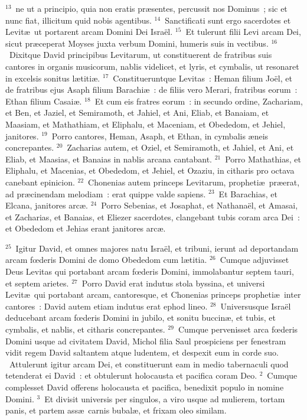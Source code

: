 ${}^{13}$~ne ut a principio, quia non eratis pr\ae sentes, percussit nos Dominus~; sic et nunc fiat, illicitum quid nobis agentibus.
${}^{14}$~Sanctificati sunt ergo sacerdotes et Levit\ae\ ut portarent arcam Domini Dei Isra\"el.
${}^{15}$~Et tulerunt filii Levi arcam Dei, sicut pr\ae ceperat Moyses juxta verbum Domini, humeris suis in vectibus.
${}^{16}$~Dixitque David principibus Levitarum, ut constituerent de fratribus suis cantores in organis musicorum, nablis videlicet, et lyris, et cymbalis, ut resonaret in excelsis sonitus l\ae titi\ae .
${}^{17}$~Constitueruntque Levitas~: Heman filium Jo\"el, et de fratribus ejus Asaph filium Barachi\ae~: de filiis vero Merari, fratribus eorum~: Ethan filium Casai\ae .
${}^{18}$~Et cum eis fratres eorum~: in secundo ordine, Zachariam, et Ben, et Jaziel, et Semiramoth, et Jahiel, et Ani, Eliab, et Banaiam, et Maasiam, et Mathathiam, et Eliphalu, et Maceniam, et Obededom, et Jehiel, janitores.
${}^{19}$~Porro cantores, Heman, Asaph, et Ethan, in cymbalis \ae neis concrepantes.
${}^{20}$~Zacharias autem, et Oziel, et Semiramoth, et Jahiel, et Ani, et Eliab, et Maasias, et Banaias in nablis arcana cantabant.
${}^{21}$~Porro Mathathias, et Eliphalu, et Macenias, et Obededom, et Jehiel, et Ozaziu, in citharis pro octava canebant epinicion.
${}^{22}$~Chonenias autem princeps Levitarum, propheti\ae\ pr\ae erat, ad pr\ae cinendam melodiam~: erat quippe valde sapiens.
${}^{23}$~Et Barachias, et Elcana, janitores arc\ae .
${}^{24}$~Porro Sebenias, et Josaphat, et Nathana\"el, et Amasai, et Zacharias, et Banaias, et Eliezer sacerdotes, clangebant tubis coram arca Dei~: et Obededom et Jehias erant janitores arc\ae .


${}^{25}$~Igitur David, et omnes majores natu Isra\"el, et tribuni, ierunt ad deportandam arcam fœderis Domini de domo Obededom cum l\ae titia.
${}^{26}$~Cumque adjuvisset Deus Levitas qui portabant arcam fœderis Domini, immolabantur septem tauri, et septem arietes.
${}^{27}$~Porro David erat indutus stola byssina, et universi Levit\ae\ qui portabant arcam, cantoresque, et Chonenias princeps propheti\ae\ inter cantores~: David autem etiam indutus erat ephod lineo.
${}^{28}$~Universusque Isra\"el deducebant arcam fœderis Domini in jubilo, et sonitu buccin\ae , et tubis, et cymbalis, et nablis, et citharis concrepantes.
${}^{29}$~Cumque pervenisset arca fœderis Domini usque ad civitatem David, Michol filia Saul prospiciens per fenestram vidit regem David saltantem atque ludentem, et despexit eum in corde suo.
~\lettrine[lines=10,image=true,loversize=0.05,lraise=-0.03]{A}{}ttulerunt igitur arcam Dei, et constituerunt eam in medio tabernaculi quod tetenderat ei David~: et obtulerunt holocausta et pacifica coram Deo.
${}^{2}$~Cumque complesset David offerens holocausta et pacifica, benedixit populo in nomine Domini.
${}^{3}$~Et divisit universis per singulos, a viro usque ad mulierem, tortam panis, et partem ass\ae\ carnis bubal\ae , et frixam oleo similam.


